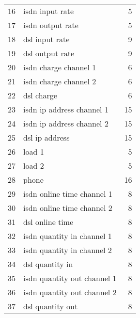 \begin{description}
\begin{table}[htbp]
\begin{small}
\begin{center}
\begin{tabular}{rlr}
                16 &      isdn input rate                 &  5 \\
                17 &      isdn output rate                &  5 \\
                18 &      dsl input rate                  &  9 \\
                19 &      dsl output rate                 &  9 \\

                20 &      isdn charge channel 1           &  6 \\
                21 &      isdn charge channel 2           &  6 \\
                22 &      dsl charge                      &  6 \\

                23 &      isdn ip address channel 1       & 15 \\
                24 &      isdn ip address channel 2       & 15 \\
                25 &      dsl ip address                  & 15 \\

                26 &      load 1                          &  5 \\
                27 &      load 2                          &  5 \\

                28 &      phone                           & 16 \\

                29 &      isdn online time channel 1      &  8 \\
                30 &      isdn online time channel 2      &  8 \\
                31 &      dsl online time                 &  8 \\

                32 &      isdn quantity in channel 1      &  8 \\
                33 &      isdn quantity in channel 2      &  8 \\
                34 &      dsl quantity in                 &  8 \\

                35 &      isdn quantity out channel 1     &  8 \\
                36 &      isdn quantity out channel 2     &  8 \\
                37 &      dsl quantity out                &  8 \\


\end{tabular}
\end{center}
\end{small}
\end{table}
\end{description}
